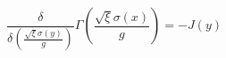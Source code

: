 \begin{equation}  \label{dudal3}
\frac{\delta}{\delta\left(\frac{\sqrt{\xi}\sigma(y)}{g}\right)}\Gamma\left(%
\frac{\sqrt{\xi}\sigma(x)}{g}\right)=-J(y)
\end{equation}

